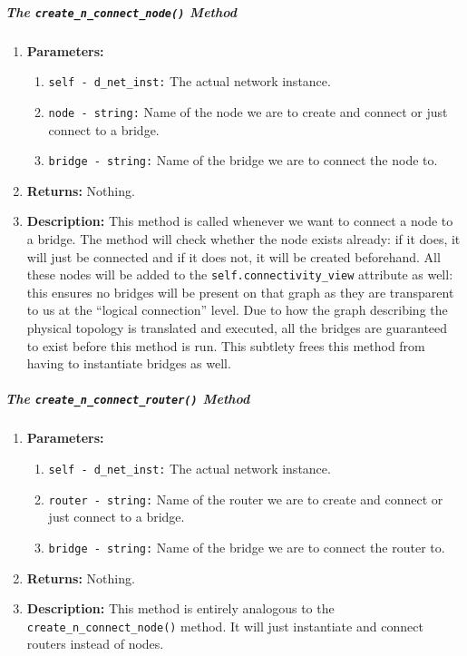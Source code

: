     \subparagraph{The \texttt{create\_n\_connect\_node()} Method}
        \begin{enumerate}
            \item \textbf{Parameters:}
            \begin{enumerate}
                \item \texttt{self - d\_net\_inst:} The actual network instance.
                \item \texttt{node - string:} Name of the node we are to create and connect or just connect to a bridge.
                \item \texttt{bridge - string:} Name of the bridge we are to connect the node to.
            \end{enumerate}
            \item \textbf{Returns:} Nothing.
            \item \textbf{Description:} This method is called whenever we want to connect a node to a bridge. The method will check whether the node exists already: if it does, it will just be connected and if it does not, it will be created beforehand. All these nodes will be added to the \texttt{self.connectivity\_view} attribute as well: this ensures no bridges will be present on that graph as they are transparent to us at the ``logical connection'' level. Due to how the graph describing the physical topology is translated and executed, all the bridges are guaranteed to exist before this method is run. This subtlety frees this method from having to instantiate bridges as well.
        \end{enumerate}

    \subparagraph{The \texttt{create\_n\_connect\_router()} Method}
        \begin{enumerate}
            \item \textbf{Parameters:}
            \begin{enumerate}
                \item \texttt{self - d\_net\_inst:} The actual network instance.
                \item \texttt{router - string:} Name of the router we are to create and connect or just connect to a bridge.
                \item \texttt{bridge - string:} Name of the bridge we are to connect the router to.
            \end{enumerate}
            \item \textbf{Returns:} Nothing.
            \item \textbf{Description:} This method is entirely analogous to the \texttt{create\_n\_connect\_node()} method. It will just instantiate and connect routers instead of nodes.
        \end{enumerate}

